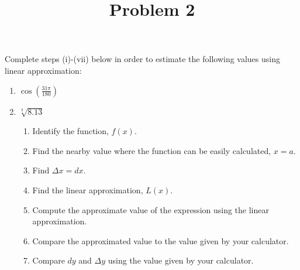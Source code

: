 \documentclass{ximera}
\title[Problem 2]{Problem 2}
\begin{document}
\begin{abstract} \end{abstract}
\maketitle


\begin{problem}

Complete steps (i)-(vii) below in order to estimate the following values using linear approximation:
\begin{enumerate}
	\item $\cos \left( \frac{31 \pi}{180} \right)$	
	\item $\sqrt[3]{8.13} $
\begin{enumerate}
\item Identify the function, $f(x)$.
      \item  Find the nearby value where the function can be easily calculated, $x=a$.
      \item Find $\Delta x=dx$.
      \item  Find the linear approximation, $L(x)$.  
\item  Compute the approximate value of the expression using the linear approximation.
	\item  Compare the approximated value to the value given by your calculator.
      \item  Compare $dy$ and $\Delta y$ using the value given by your calculator.
\end{enumerate}
\end{enumerate}


\end{problem}
\end{document}
